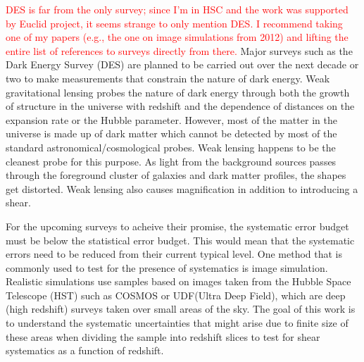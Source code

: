 \documentclass[twocolumn,useAMS,usenatbib]{mn2e}
\newcommand{\rachel}[1]{{\textcolor{red}{#1}}}
\begin{document}
\rachel{DES is far from the only survey; since I'm in HSC and the work was supported by Euclid project, it seems strange to only mention DES.  I recommend taking one of my papers (e.g., the one on image simulations from 2012) and lifting the entire list of references to surveys directly from there.}
Major surveys such as the Dark Energy Survey (DES) are planned to be carried out over the next decade or two to make measurements that constrain the nature of dark energy.
Weak gravitational lensing probes the nature of dark energy through both the growth of structure in the universe with redshift and the dependence of distances on the expansion rate or the Hubble parameter.
However, most of the matter in the universe is made up of dark matter which cannot be detected by most of the standard astronomical/cosmological probes. Weak lensing happens to be the cleanest probe for this purpose.
As light from the background sources passes through the foreground cluster of galaxies and dark matter profiles, the shapes get distorted. Weak lensing also causes magnification in addition to introducing a shear.

For the upcoming surveys to acheive their promise, the systematic error budget must be below the statistical error budget. This would mean that the systematic errors need to be reduced from their current typical level.
One method that is commonly used to test for the presence of systematics is image simulation. Realistic simulations use samples based on images taken from the Hubble Space Telescope (HST) such as COSMOS or UDF(Ultra Deep Field), which are deep (high redshift) surveys taken over small areas of the sky.
The goal of this work is to understand the systematic uncertainties that might arise due to finite size of these areas when dividing the sample into redshift slices to test for 
shear systematics as a function of redshift.
\end{document}
